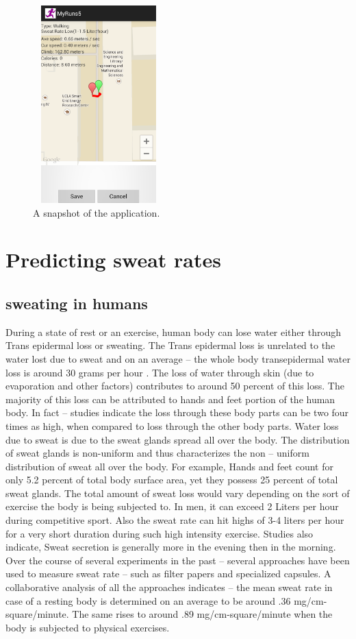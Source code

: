\documentclass[conference]{IEEEtran}
\begin{document}
\begin{figure}
\centering
  \includegraphics[width=2in,height=3in]{app_screen_shot.pdf}
  \caption{A snapshot of the application.}
\end{figure}

\section{Predicting sweat rates}
\subsection{sweating in humans}
During a state of rest or an exercise, human body can lose water either through Trans epidermal loss or sweating. The Trans epidermal loss is unrelated to the water lost due to sweat and on an average – the whole body transepidermal water loss is around 30 grams per hour \cite{sweat1}. The loss of water through skin (due to evaporation and other factors) contributes to around 50 percent of this loss. The majority of this loss can be attributed to hands and feet portion of the human body. In fact – studies indicate the loss through these body parts can be two four times as high, when compared to loss through the other body parts.
Water loss due to sweat is due to the sweat glands spread all over the body. The distribution of sweat glands is non-uniform and thus characterizes the non – uniform distribution of sweat all over the body. For example, Hands and feet count for only 5.2 percent of total body surface area, yet they possess 25 percent of total sweat glands.
The total amount of sweat loss would vary depending on the sort of exercise the body is being subjected to. In men, it can exceed 2 Liters per hour during competitive sport. Also the sweat rate can hit highs of 3-4 liters per hour for a very short duration during such high intensity exercise. Studies also indicate, Sweat secretion is generally more in the evening then in the morning. Over the course of several experiments in the past – several approaches have been used to measure sweat rate – such as filter papers and specialized capsules. A collaborative analysis of all the approaches indicates – the mean sweat rate in case of a resting body is determined on an average to be around .36 mg/cm-square/minute. The same rises to around .89 mg/cm-square/minute when the body is subjected to physical exercises.
\end{document}
